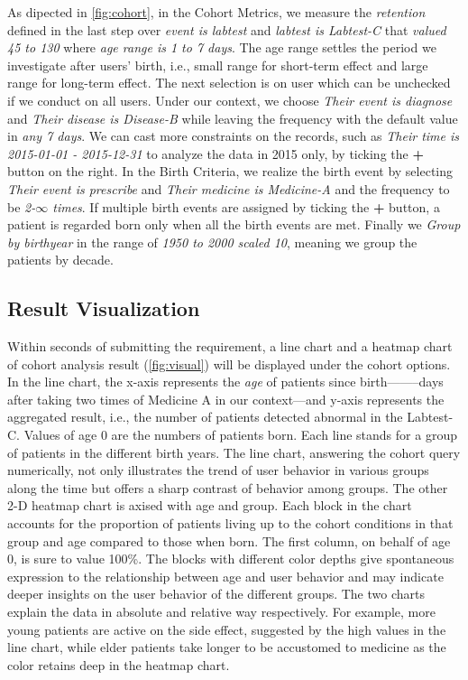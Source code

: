 \documentclass[10pt,conference,letterpaper]{IEEEtran}
\begin{document}
As dipected in \ref{fig:cohort}, in the Cohort Metrics, we measure the \emph{retention} defined in the last step over \emph{event is labtest} and \emph{labtest is Labtest-C} that \emph{valued 45 to 130} where \emph{age range is 1 to 7 days}. The age range settles the period we investigate after users' birth, i.e., small range for short-term effect and large range for long-term effect. The next selection is on user which can be unchecked if we conduct on all users. Under our context, we choose \emph{Their event is diagnose} and \emph{Their disease is Disease-B} while leaving the frequency with the default value in \emph{any 7 days}. We can cast more constraints on the records, such as \emph{Their time is 2015-01-01 - 2015-12-31} to analyze the data in 2015 only, by ticking the \textbf{+} button on the right. In the Birth Criteria, we realize the birth event by selecting \emph{Their event is prescribe} and \emph{Their medicine is Medicine-A} and the frequency to be \emph{2-$\infty$ times}. If multiple birth events are assigned by ticking the \textbf{+} button, a patient is regarded born only when all the birth events are met. Finally we \emph{Group by birthyear} in the range of \emph{1950 to 2000 scaled 10}, meaning we group the patients by decade.

\subsection{Result Visualization}

Within seconds of submitting the requirement, a line chart and a heatmap chart of cohort analysis result (\ref{fig:visual}) will be displayed under the cohort options. In the line chart, the x-axis represents the \emph{age} of patients since birth——--days after taking two times of Medicine A in our context---and y-axis represents the aggregated result, i.e., the number of patients detected abnormal in the Labtest-C. Values of age 0 are the numbers of patients born. Each line stands for a group of patients in the different birth years. The line chart, answering the cohort query numerically, not only illustrates the trend of user behavior in various groups along the time but offers a sharp contrast of behavior among groups. The other 2-D heatmap chart is axised with age and group. Each block in the chart accounts for the proportion of patients living up to the cohort conditions in that group and age compared to those when born. The first column, on behalf of age 0, is sure to value 100\%. The blocks with different color depths give spontaneous expression to the relationship between age and user behavior and may indicate deeper insights on the user behavior of the different groups. The two charts explain the data in absolute and relative way respectively. For example, more young patients are active on the side effect, suggested by the high values in the line chart, while elder patients take longer to be accustomed to medicine as the color retains deep in the heatmap chart.
\end{document}
